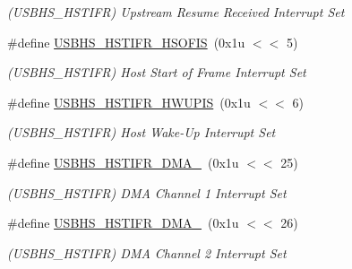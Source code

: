 \begin{DoxyCompactItemize}
\begin{DoxyCompactList}\small\item\em (U\+S\+B\+H\+S\+\_\+\+H\+S\+T\+I\+FR) Upstream Resume Received Interrupt Set \end{DoxyCompactList}\item 
\mbox{\label{group__SAMV71__USBHS_ga058eec9cbe60b84e56a33cb97ad48712}} 
\#define \mbox{\hyperlink{group__SAMV71__USBHS_ga058eec9cbe60b84e56a33cb97ad48712}{U\+S\+B\+H\+S\+\_\+\+H\+S\+T\+I\+F\+R\+\_\+\+H\+S\+O\+F\+IS}}~(0x1u $<$$<$ 5)
\begin{DoxyCompactList}\small\item\em (U\+S\+B\+H\+S\+\_\+\+H\+S\+T\+I\+FR) Host Start of Frame Interrupt Set \end{DoxyCompactList}\item 
\mbox{\label{group__SAMV71__USBHS_gabfdb08e9e4fe591cd781dd845c9b7712}} 
\#define \mbox{\hyperlink{group__SAMV71__USBHS_gabfdb08e9e4fe591cd781dd845c9b7712}{U\+S\+B\+H\+S\+\_\+\+H\+S\+T\+I\+F\+R\+\_\+\+H\+W\+U\+P\+IS}}~(0x1u $<$$<$ 6)
\begin{DoxyCompactList}\small\item\em (U\+S\+B\+H\+S\+\_\+\+H\+S\+T\+I\+FR) Host Wake-\/\+Up Interrupt Set \end{DoxyCompactList}\item 
\mbox{\label{group__SAMV71__USBHS_gac1888edbfcc052261aa510d80d58e295}} 
\#define \mbox{\hyperlink{group__SAMV71__USBHS_gac1888edbfcc052261aa510d80d58e295}{U\+S\+B\+H\+S\+\_\+\+H\+S\+T\+I\+F\+R\+\_\+\+D\+M\+A\+\_}}~(0x1u $<$$<$ 25)
\begin{DoxyCompactList}\small\item\em (U\+S\+B\+H\+S\+\_\+\+H\+S\+T\+I\+FR) D\+MA Channel 1 Interrupt Set \end{DoxyCompactList}\item 
\mbox{\label{group__SAMV71__USBHS_ga50434e1d59cd6cdc2450bd0006417753}} 
\#define \mbox{\hyperlink{group__SAMV71__USBHS_ga50434e1d59cd6cdc2450bd0006417753}{U\+S\+B\+H\+S\+\_\+\+H\+S\+T\+I\+F\+R\+\_\+\+D\+M\+A\+\_}}~(0x1u $<$$<$ 26)
\begin{DoxyCompactList}\small\item\em (U\+S\+B\+H\+S\+\_\+\+H\+S\+T\+I\+FR) D\+MA Channel 2 Interrupt Set \end{DoxyCompactList}\item 

\end{DoxyCompactItemize}
